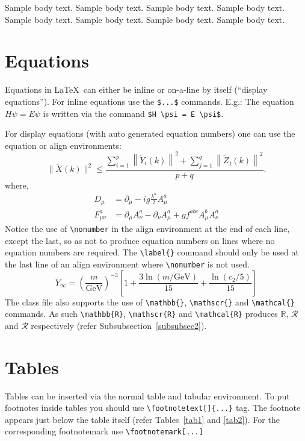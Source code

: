 \documentclass[sn-mathphys-num]{sn-jnl}%
\theoremstyle{thmstyleone}%
\theoremstyle{thmstyletwo}%
\theoremstyle{thmstylethree}%
\begin{document}
Sample body text. Sample body text. Sample body text. Sample body text. Sample body text. Sample body text. Sample body text. Sample body text.

\section{Equations}\label{sec4}

Equations in \LaTeX\ can either be inline or on-a-line by itself (``display equations''). For
inline equations use the \verb+$...$+ commands. E.g.: The equation
$H\psi = E \psi$ is written via the command \verb+$H \psi = E \psi$+.

For display equations (with auto generated equation numbers)
one can use the equation or align environments:
\begin{equation}
    \|\tilde{X}(k)\|^2 \leq\frac{\sum\limits_{i=1}^{p}\left\|\tilde{Y}_i(k)\right\|^2+\sum\limits_{j=1}^{q}\left\|\tilde{Z}_j(k)\right\|^2 }{p+q}.\label{eq1}
\end{equation}
where,
\begin{align}
    D_\mu        & =  \partial_\mu - ig \frac{\lambda^a}{2} A^a_\mu \nonumber                            \\
    F^a_{\mu\nu} & = \partial_\mu A^a_\nu - \partial_\nu A^a_\mu + g f^{abc} A^b_\mu A^a_\nu \label{eq2}
\end{align}
Notice the use of \verb+\nonumber+ in the align environment at the end
of each line, except the last, so as not to produce equation numbers on
lines where no equation numbers are required. The \verb+\label{}+ command
should only be used at the last line of an align environment where
\verb+\nonumber+ is not used.
\begin{equation}
    Y_\infty = \left( \frac{m}{\textrm{GeV}} \right)^{-3}
    \left[ 1 + \frac{3 \ln(m/\textrm{GeV})}{15}
        + \frac{\ln(c_2/5)}{15} \right]
\end{equation}
The class file also supports the use of \verb+\mathbb{}+, \verb+\mathscr{}+ and
\verb+\mathcal{}+ commands. As such \verb+\mathbb{R}+, \verb+\mathscr{R}+
and \verb+\mathcal{R}+ produces $\mathbb{R}$, $\mathscr{R}$ and $\mathcal{R}$
respectively (refer Subsubsection~\ref{subsubsec2}).

\section{Tables}\label{sec5}

Tables can be inserted via the normal table and tabular environment. To put
footnotes inside tables you should use \verb+\footnotetext[]{...}+ tag.
The footnote appears just below the table itself (refer Tables~\ref{tab1} and \ref{tab2}).
For the corresponding footnotemark use \verb+\footnotemark[...]+
\end{document}
